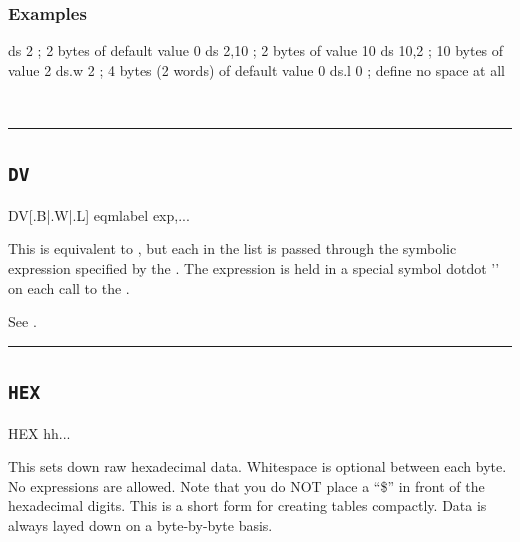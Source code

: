 \subsubsection{Examples}

\begin{code}[caption=Declaring Space]
 ds 2     ; 2 bytes of default value 0
 ds 2,10  ; 2 bytes of value 10
 ds 10,2  ; 10 bytes of value 2
 ds.w 2   ; 4 bytes (2 words) of default value 0
 ds.l 0   ; define no space at all
 \end{code}

\\

\hrule
\subsection{\texttt{DV}}
\label{pseudoop:dv}

\begin{usage}
  DV[{.B|.W|.L}] eqmlabel exp,...
\end{usage}

This is equivalent to , but each  in the list is passed
through the symbolic expression specified by the .
The expression is held in a special symbol dotdot '' on each
call to the .

See .\\

\hrule

\subsection{\texttt{HEX}}
\label{pseudoop:hex}

\begin{usage}
  HEX {hh...}
\end{usage}

This sets down raw hexadecimal data.  Whitespace is optional between each  byte.
No expressions are allowed.  Note that you do NOT place a ``\$''
in front of the hexadecimal digits.  This is a short form for creating
tables compactly.  Data is always layed down on a byte-by-byte
basis.

